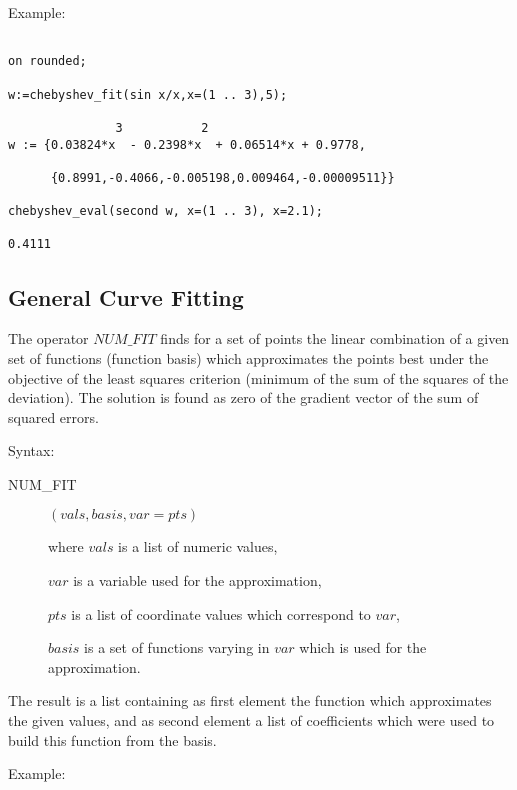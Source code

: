 Example:

\begin{verbatim}

on rounded;

w:=chebyshev_fit(sin x/x,x=(1 .. 3),5);

               3           2
w := {0.03824*x  - 0.2398*x  + 0.06514*x + 0.9778,

      {0.8991,-0.4066,-0.005198,0.009464,-0.00009511}}

chebyshev_eval(second w, x=(1 .. 3), x=2.1);

0.4111

\end{verbatim}

\subsection{General Curve Fitting}

The operator $NUM\_FIT$ finds for a set of
points the linear combination of a given set of
functions (function basis) which approximates the
points best under the objective of the least squares
criterion (minimum of the sum of the squares of the deviation).
The solution is found as zero of the
gradient vector of the sum of squared errors.

Syntax:

\begin{description}
\item[NUM\_FIT] $(vals,basis,var=pts)$

where $vals$ is a list of numeric values,

$var$ is a variable used for the approximation,

$pts$ is a list of coordinate values which correspond to $var$,

$basis$ is a set of functions varying in $var$ which is used
  for the approximation.

\end{description}

The result is a list containing as first element the
function which approximates the given values, and as
second element a list of coefficients which were used
to build this function from the basis.

Example:

